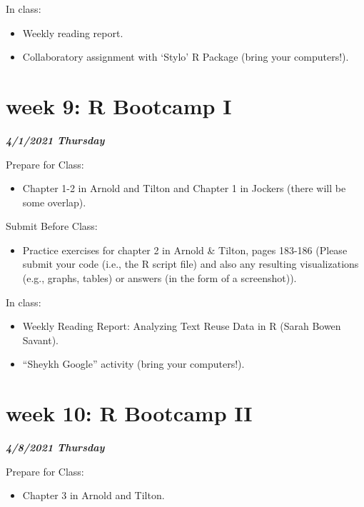 \documentclass[
]{book}
\providecommand{\tightlist}{%
  \setlength{\itemsep}{0pt}\setlength{\parskip}{0pt}}
\begin{document}
In class:

\begin{itemize}
\tightlist
\item
  Weekly reading report.
\item
  Collaboratory assignment with `Stylo' R Package (bring your computers!).
\end{itemize}

\hypertarget{week-9-r-bootcamp-i-1}{%
\chapter{week 9: R Bootcamp I}\label{week-9-r-bootcamp-i-1}}

\textbf{\emph{4/1/2021 Thursday}}

Prepare for Class:

\begin{itemize}
\tightlist
\item
  Chapter 1-2 in Arnold and Tilton and Chapter 1 in Jockers (there will be some overlap).
\end{itemize}

Submit Before Class:

\begin{itemize}
\tightlist
\item
  Practice exercises for chapter 2 in Arnold \& Tilton, pages 183-186 (Please submit your code (i.e., the R script file) and also any resulting visualizations (e.g., graphs, tables) or answers (in the form of a screenshot)).
\end{itemize}

In class:

\begin{itemize}
\tightlist
\item
  Weekly Reading Report: Analyzing Text Reuse Data in R (Sarah Bowen Savant).
\item
  ``Sheykh Google'' activity (bring your computers!).
\end{itemize}

\hypertarget{week-10-r-bootcamp-ii-1}{%
\chapter{week 10: R Bootcamp II}\label{week-10-r-bootcamp-ii-1}}

\textbf{\emph{4/8/2021 Thursday}}

Prepare for Class:

\begin{itemize}
\tightlist
\item
  Chapter 3 in Arnold and Tilton.
\end{itemize}
\end{document}

